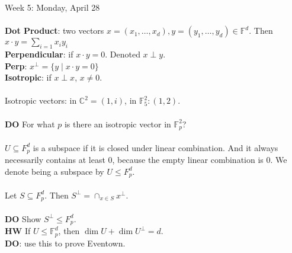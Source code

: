 \documentclass[12pt]{article}
\theoremstyle{remark}
\newcommand{\F}{\mathbb{F}}
\newcommand{\C}{\mathbb{C}}
\begin{document}
\begin{section}{Week 5: Monday, April 28}
 \\\\
 \textbf{Dot Product}: two vectors $x = (x_1,\ldots,x_d), y = (y_1,\ldots,y_d) \in \F^d$. Then $x \cdot y = \sum_{i=1} x_iy_i$
 \\\textbf{Perpendicular}: if $x \cdot y = 0$. Denoted $x \perp y$.
 \\\textbf{Perp}: $x^\perp = \{y \mid x \cdot y = 0\}$
 \\\textbf{Isotropic}: if $x \perp x$, $x \neq 0$.
 \\\\
 Isotropic vectors: in $\C^2 = (1,i)$, in $\F_5^2: (1,2)$.
\\\\ \textbf{DO} For what $p$ is there an isotropic vector in $\F_p^2$?
\\\\
$U \subseteq F_p^d$ is a subspace if it is closed under linear combination. And it always necessarily contains at least $0$, because the empty linear combination is $0$. We denote being a subspace by $U \leqslant F_p^d$.
\\\\
Let $S \subseteq F_p^d$. Then $S^\perp = \cap_{x \in S} x^\perp$.
\\\\
\textbf{DO} Show $S^\perp \leqslant F_p^d$.
\\\textbf{HW} If $U \leqslant \F_p^d$, then $\dim U + \dim U^\perp = d$. 
\\\textbf{DO}: use this to prove Eventown.
\end{section}
\newpage
\end{document}
